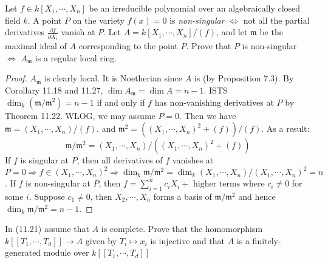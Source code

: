 \documentclass{solution}
\begin{document}
\begin{problem}
    Let $f \in k[X_1, \cdots, X_n]$ be an irreducible polynomial over an algebraically closed field $k$. A point $P$ on the variety $f(x) = 0$ is \textit{non-singular} $\Leftrightarrow$ not all the partial derivatives $\frac{\partial f}{\partial X_i}$ vanish at $P$. Let $A = k[X_1, \cdots, X_n] / (f)$, and let $\mathfrak{m}$ be the maximal ideal of $A$ corresponding to the point $P$. Prove that $P$ is non-singular $\Leftrightarrow$ $A_{\mathfrak{m}}$ is a regular local ring.
\end{problem}

\begin{proof}
    $A_{\mathfrak{m}}$ is clearly local. It is Noetherian since $A$ is (by Proposition 7.3). By Corollary 11.18 and 11.27, $\dim A_{\mathfrak{m}} = \dim A = n - 1$. ISTS $\dim_k(\mathfrak{m} / \mathfrak{m}^2) = n - 1$ if and only if $f$ has non-vanishing derivatives at $P$ by Theorem 11.22. WLOG, we may assume $P = 0$. Then we have $\mathfrak{m} = (X_1, \cdots, X_n) / (f)$. and $\mathfrak{m}^2 = ((X_1, \cdots, X_n)^2 + (f)) / (f)$. As a result:
    $$\mathfrak{m} / \mathfrak{m}^2 = (X_1, \cdots, X_n) / ((X_1, \cdots, X_n)^2 + (f))$$
    If $f$ is singular at $P$, then all derivatives of $f$ vanishes at $P = 0 \Rightarrow f \in (X_1, \cdots, X_n)^2 \Rightarrow \dim_k \mathfrak{m} / \mathfrak{m}^2 = \dim_k (X_1, \cdots, X_n) / (X_1, \cdots, X_n)^2 = n$. If $f$ is non-singular at $P$, then $f = \sum\limits_{i = 1}^{n} c_i X_i + \text{ higher terms}$ where $c_i \ne 0$ for some $i$. Suppose $c_1 \ne 0$, then $X_2, \cdots, X_n$ forms a basis of $\mathfrak{m} / \mathfrak{m}^2$ and hence $\dim_k \mathfrak{m} / \mathfrak{m}^2 = n - 1$.
\end{proof}

\begin{problem}
    In (11.21) assume that $A$ is complete. Prove that the homomorphism $k[[T_1, \cdots, T_d]] \rightarrow A$ given by $T_i \mapsto x_i$ is injective and that $A$ is a finitely-generated module over $k[[T_1, \cdots, T_d]]$
\end{problem}
\end{document}
